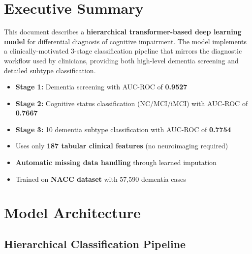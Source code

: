 \documentclass[11pt,a4paper]{article}
\begin{document}
\tableofcontents
\newpage

\section{Executive Summary}

This document describes a \textbf{hierarchical transformer-based deep learning model} for differential diagnosis of cognitive impairment. The model implements a clinically-motivated 3-stage classification pipeline that mirrors the diagnostic workflow used by clinicians, providing both high-level dementia screening and detailed subtype classification.

\begin{tcolorbox}[colback=blue!5!white, colframe=blue!75!black, title=Key Highlights]
\begin{itemize}[leftmargin=*]
    \item \textbf{Stage 1:} Dementia screening with AUC-ROC of \textbf{0.9527}
    \item \textbf{Stage 2:} Cognitive status classification (NC/MCI/iMCI) with AUC-ROC of \textbf{0.7667}
    \item \textbf{Stage 3:} 10 dementia subtype classification with AUC-ROC of \textbf{0.7754}
    \item Uses only \textbf{187 tabular clinical features} (no neuroimaging required)
    \item \textbf{Automatic missing data handling} through learned imputation
    \item Trained on \textbf{NACC dataset} with 57,590 dementia cases
\end{itemize}
\end{tcolorbox}

\section{Model Architecture}

\subsection{Hierarchical Classification Pipeline}
\end{document}
